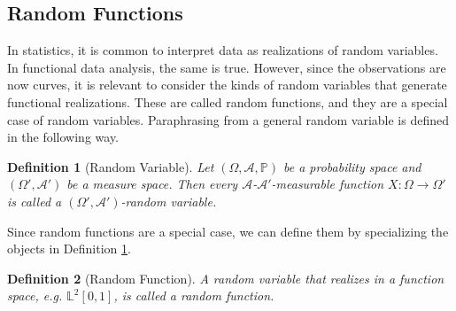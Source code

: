 \documentclass[12pt, a4paper]{article}
\theoremstyle{MAstyle} \newtheorem{assumption}{Assumption}[section]
\theoremstyle{MAstyle} \newtheorem{definition}{Definition}[section]
\theoremstyle{MAstyle} \newtheorem{theorem}{Theorem}[section]
\begin{document}
		\subsection{Random Functions}
			In statistics, it is common to interpret data as realizations of random variables. In functional data analysis, the same is true. However, since the observations are now curves, it is relevant to consider the kinds of random variables that generate functional realizations. These are called random functions, and they are a special case of random variables. Paraphrasing from \cite{bauer_probability_2011} a general random variable is defined in the following way.
			\begin{definition}[Random Variable]\label{rand_var}
				Let $\left(\Omega, \mathcal{A}, \mathbb{P}\right)$ be a probability space and $\left(\Omega', \mathcal{A}'\right)$ be a measure space. Then every $\mathcal{A}$-$\mathcal{A}'$-measurable function $X:\Omega \rightarrow \Omega'$ is called a $\left(\Omega', \mathcal{A}'\right)$-random variable.
			\end{definition}
			Since random functions are a special case, we can define them by specializing the objects in Definition \ref{rand_var}.
			\begin{definition}[Random Function]
				A random variable that realizes in a function space, e.g. $\mathbb{L}^2[0,1]$, is called a random function.
			\end{definition}
		
\end{document}
